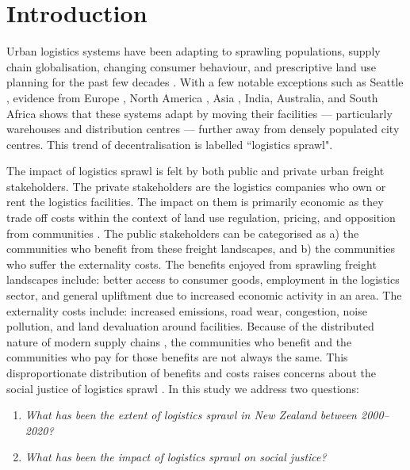 \documentclass[3p, a4paper, authoryear, 11pt, fleqn, review]{elsarticle}
\newcommand{\nmt}[1]{{\color{red}{~(nmt: #1)}}}
\begin{document}
\section{Introduction}
\label{sec:Intro}
\nmt{Should paraphrase}
Urban logistics systems have been adapting to sprawling populations, supply chain globalisation, changing consumer behaviour, and prescriptive land use planning for the past few decades \citep{AljohaniThompson2016, He_etal2018, Sakai_etal2015, Kang2020}. With a few notable exceptions such as Seattle \citep{Dablanc_etal2014}, evidence from Europe \citep{DablancRakotonarivo2010, Kumhalova2019,Strale2020}, North America \citep{Cidell2010, Jaller_etal2017, Kang2020, Kang2020b, Kang2020c}, Asia \citep{He_etal2019, LimPark2020, Sakai_etal2015, Sakai_etal2017}, India, Australia, and South Africa \citep{CoetzeeSwanepoel2017} shows that these systems adapt by moving their facilities --- particularly warehouses and distribution centres --- further away from densely populated city centres. 
This trend of decentralisation is labelled ``logistics sprawl". 

The impact of logistics sprawl is felt by both public and private urban freight stakeholders. The private stakeholders are the logistics companies who own or rent the logistics facilities. The impact on them is primarily economic as they trade off costs within the context of land use regulation, pricing, and opposition from communities \citep{Lindsey_etal2014}. The public stakeholders can be categorised as a) the communities who benefit from these freight landscapes, and b) the communities who suffer the externality costs. The benefits enjoyed from sprawling freight landscapes include: better access to consumer goods, employment in the logistics sector, and general upliftment due to increased economic activity in an area. The externality costs include: increased emissions, road wear, congestion, noise pollution, and land devaluation around facilities. Because of the distributed nature of modern supply chains \citep{Cidell2015}, the communities who benefit and the communities who pay for those benefits are not always the same. This disproportionate distribution of benefits and costs raises concerns about the social justice of logistics sprawl \citep{Cidell2015, Yuan2018}. In this study we address two questions:
\begin{enumerate}
\item \emph{What has been the extent of logistics sprawl in New Zealand between 2000--2020?}
\item \emph{What has been the impact of logistics sprawl on social justice?}	
\end{enumerate}
\end{document}
